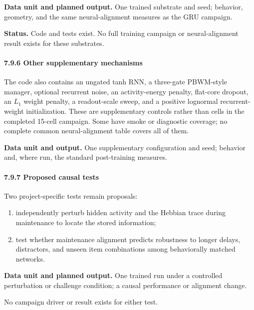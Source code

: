 \documentclass[
  10pt,
]{article}
\providecommand{\tightlist}{%
  \setlength{\itemsep}{0pt}\setlength{\parskip}{0pt}}
\begin{document}
\textbf{Data unit and planned output.} One trained substrate and seed;
behavior, geometry, and the same neural-alignment measures as the GRU
campaign.

\textbf{Status.} Code and tests exist. No full training campaign or
neural-alignment result exists for these substrates.

\hypertarget{other-supplementary-mechanisms}{%
\paragraph{7.9.6 Other supplementary
mechanisms}\label{other-supplementary-mechanisms}}

The code also contains an ungated tanh RNN, a three-gate PBWM-style
manager, optional recurrent noise, an activity-energy penalty, flat-core
dropout, an \(L_1\) weight penalty, a readout-scale sweep, and a
positive lognormal recurrent-weight initialization. These are
supplementary controls rather than cells in the completed 15-cell
campaign. Some have smoke or diagnostic coverage; no complete common
neural-alignment table covers all of them.

\textbf{Data unit and output.} One supplementary configuration and seed;
behavior and, where run, the standard post-training measures.

\hypertarget{proposed-causal-tests}{%
\paragraph{7.9.7 Proposed causal tests}\label{proposed-causal-tests}}

Two project-specific tests remain proposals:

\begin{enumerate}
\def\labelenumi{\arabic{enumi}.}
\tightlist
\item
  independently perturb hidden activity and the Hebbian trace during
  maintenance to locate the stored information;
\item
  test whether maintenance alignment predicts robustness to longer
  delays, distractors, and unseen item combinations among behaviorally
  matched networks.
\end{enumerate}

\textbf{Data unit and planned output.} One trained run under a
controlled perturbation or challenge condition; a causal performance or
alignment change.

No campaign driver or result exists for either test.
\end{document}

